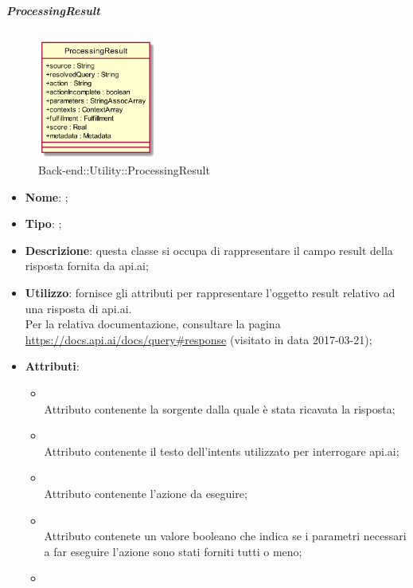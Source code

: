 \hypertarget{ProcessingResult_label}{\subparagraph{ProcessingResult}}
\begin{figure}[h]
	\centering
	\includegraphics[width=0.35\textwidth,height=\textheight,keepaspectratio]{images/ClassProcessingResult.png}
	\caption{Back-end::Utility::ProcessingResult}
\end{figure}
\begin{itemize}
	\item \textbf{Nome}: ;
	\item \textbf{Tipo}: ;
	\item \textbf{Descrizione}: questa classe si occupa di rappresentare il campo result della risposta fornita da api.ai;
	\item \textbf{Utilizzo}: fornisce gli attributi per rappresentare l'oggetto result relativo ad una risposta di api.ai. \\
Per la relativa documentazione, consultare la pagina \url{https://docs.api.ai/docs/query#response} (visitato in data 2017-03-21);
	\item \textbf{Attributi}:
	\begin{itemize}
		\item[]  \\
		Attributo contenente la sorgente dalla quale è stata ricavata la risposta;
		\item[]  \\
		Attributo contenente il testo dell'intents utilizzato per interrogare api.ai;
		\item[]  \\
		Attributo contenente l'azione da eseguire;
		\item[]  \\
		Attributo contenete un valore booleano che indica se i parametri necessari a far eseguire l'azione sono stati forniti tutti o meno;
		\item[]  \\

\end{itemize}
\end{itemize}
